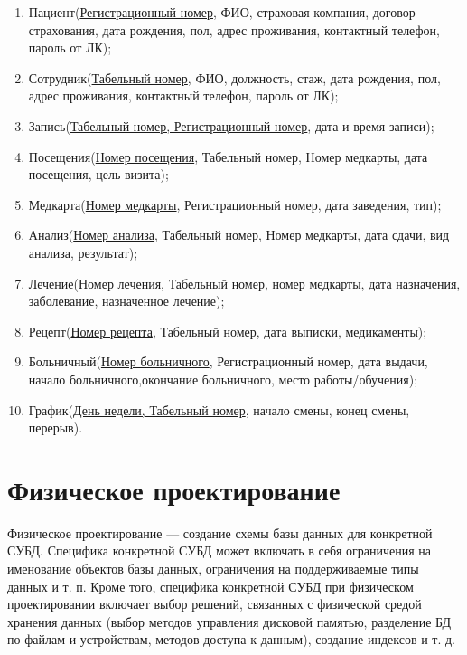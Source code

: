 \documentclass[14pt,a4paper,russian]{extreport}
\begin{document}
\begin{enumerate}[noitemsep]
            \item Пациент(\underline{Регистрационный номер}, ФИО, страховая компания, договор страхования, дата рождения, пол, адрес
                проживания, контактный телефон, пароль от ЛК);
            \item Сотрудник(\underline{Табельный номер}, ФИО, должность, стаж, дата рождения, пол, адрес
                проживания, контактный телефон, пароль от ЛК);
            \item Запись(\underline{Табельный номер, Регистрационный номер}, дата и время записи);
	    \item Посещения(\underline{Номер посещения}, Табельный номер, Номер медкарты, дата посещения,
                цель визита);
            \item Медкарта(\underline{Номер медкарты}, Регистрационный номер, дата заведения, тип);
	    \item Анализ(\underline{Номер анализа}, Табельный номер, Номер медкарты, дата сдачи, вид анализа,
                результат);
	\item Лечение(\underline{Номер лечения}, Табельный номер, номер медкарты, дата назначения,
                заболевание, назначенное лечение);
            \item Рецепт(\underline{Номер рецепта}, Табельный номер, дата выписки, медикаменты);
            \item Больничный(\underline{Номер больничного}, Регистрационный номер, дата выдачи,
                начало больничного,окончание больничного, место работы/обучения);
            \item График(\underline{День недели, Табельный номер}, начало смены, конец смены,
                перерыв).
\end{enumerate}



\chapter{Физическое проектирование}
Физическое проектирование — создание схемы базы данных для конкретной СУБД. Специфика конкретной
СУБД может включать в себя ограничения на именование объектов базы данных, ограничения на
поддерживаемые типы данных и т. п. Кроме того, специфика конкретной СУБД при физическом
проектировании включает выбор решений, связанных с физической средой хранения данных (выбор методов
управления дисковой памятью, разделение БД по файлам и устройствам, методов доступа к данным),
создание индексов и т. д.\cite{dbdesign} 
\end{document}
